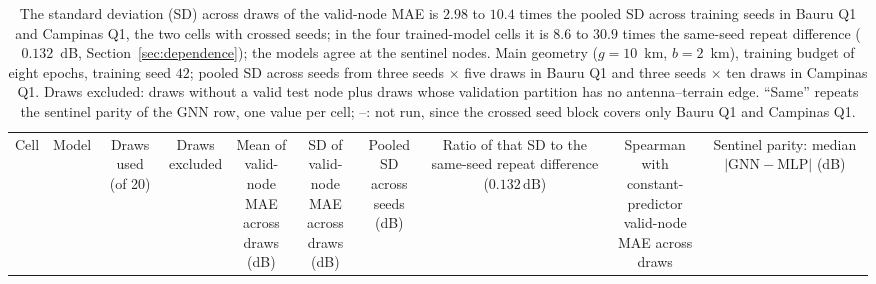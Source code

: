 \begin{table}[H]
\caption{The standard deviation (SD) across draws of the valid-node MAE is $2.98$ to $10.4$ times the pooled SD across training seeds in Bauru Q1 and Campinas Q1, the two cells with crossed seeds; in the four trained-model cells it is $8.6$ to $30.9$ times the same-seed repeat difference ($0.132$~dB, Section~\ref{sec:dependence}); the models agree at the sentinel nodes. Main geometry ($g = 10$~km, $b = 2$~km), training budget of eight epochs, training seed $42$; pooled SD across seeds from three seeds $\times$ five draws in Bauru Q1 and three seeds $\times$ ten draws in Campinas Q1. Draws excluded: draws without a valid test node plus draws whose validation partition has no antenna--terrain edge. ``Same'' repeats the sentinel parity of the GNN row, one value per cell; --: not run, since the crossed seed block covers only Bauru Q1 and Campinas Q1.}
\label{tab:drift_models_g10}
\centering
\begin{tabular}{llcccccccc}
\toprule
Cell & Model & \celula{Draws used \\ \relax (of 20)} & \celula{Draws \\ \relax excluded} & \celula{Mean of \\ \relax valid-node \\ \relax MAE across \\ \relax draws (dB)} & \celula{SD of \\ \relax valid-node \\ \relax MAE across \\ \relax draws (dB)} & \celula{Pooled SD \\ \relax across \\ \relax seeds (dB)} & \celula{Ratio of \\ \relax that SD to \\ \relax the \\ \relax same-seed \\ \relax repeat \\ \relax difference \\ \relax ($0.132\,\mathrm{dB}$)} & \celula{Spearman \\ \relax with \\ \relax constant-predictor \\ \relax valid-node \\ \relax MAE across \\ \relax draws} & \celula{Sentinel \\ \relax parity: \\ \relax median \\ \relax $|\mathrm{GNN}-\mathrm{MLP}|$ \\ \relax (dB)} \\

\end{tabular}
\end{table}
